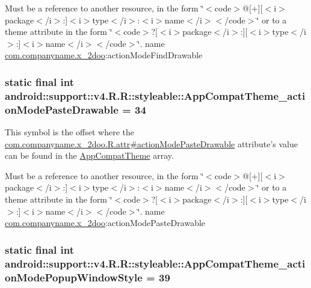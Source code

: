 Must be a reference to another resource, in the form \char`\"{}$<$code$>$@\mbox{[}+\mbox{]}\mbox{[}$<$i$>$package$<$/i$>$:\mbox{]}$<$i$>$type$<$/i$>$:$<$i$>$name$<$/i$>$$<$/code$>$\char`\"{} or to a theme attribute in the form \char`\"{}$<$code$>$?\mbox{[}$<$i$>$package$<$/i$>$:\mbox{]}\mbox{[}$<$i$>$type$<$/i$>$:\mbox{]}$<$i$>$name$<$/i$>$$<$/code$>$\char`\"{}.  name \hyperlink{namespacecom_1_1companyname_1_1x__2doo}{com.companyname.x\_\-2doo}:actionModeFindDrawable \hypertarget{classandroid_1_1support_1_1v4_1_1_r_1_1styleable_ce113ab232516420cf074243bfe9453f}{
\subsubsection[{AppCompatTheme\_\-actionModePasteDrawable}]{\setlength{\rightskip}{0pt plus 5cm}static final int android::support::v4.R.R::styleable::AppCompatTheme\_\-actionModePasteDrawable = 34}}
\label{classandroid_1_1support_1_1v4_1_1_r_1_1styleable_ce113ab232516420cf074243bfe9453f}


This symbol is the offset where the \hyperlink{classcom_1_1companyname_1_1x__2doo_1_1_r_1_1attr_f3109503a593354ec182a78ec9eca547}{com.companyname.x\_\-2doo.R.attr\#actionModePasteDrawable} attribute's value can be found in the \hyperlink{classandroid_1_1support_1_1v4_1_1_r_1_1styleable_0873e92ba21076bb5a4aeadeb7f5779f}{AppCompatTheme} array.

Must be a reference to another resource, in the form \char`\"{}$<$code$>$@\mbox{[}+\mbox{]}\mbox{[}$<$i$>$package$<$/i$>$:\mbox{]}$<$i$>$type$<$/i$>$:$<$i$>$name$<$/i$>$$<$/code$>$\char`\"{} or to a theme attribute in the form \char`\"{}$<$code$>$?\mbox{[}$<$i$>$package$<$/i$>$:\mbox{]}\mbox{[}$<$i$>$type$<$/i$>$:\mbox{]}$<$i$>$name$<$/i$>$$<$/code$>$\char`\"{}.  name \hyperlink{namespacecom_1_1companyname_1_1x__2doo}{com.companyname.x\_\-2doo}:actionModePasteDrawable \hypertarget{classandroid_1_1support_1_1v4_1_1_r_1_1styleable_bcdd14cc5abf52a599a9a9d79cd848bd}{
\subsubsection[{AppCompatTheme\_\-actionModePopupWindowStyle}]{\setlength{\rightskip}{0pt plus 5cm}static final int android::support::v4.R.R::styleable::AppCompatTheme\_\-actionModePopupWindowStyle = 39}}
\label{classandroid_1_1support_1_1v4_1_1_r_1_1styleable_bcdd14cc5abf52a599a9a9d79cd848bd}


